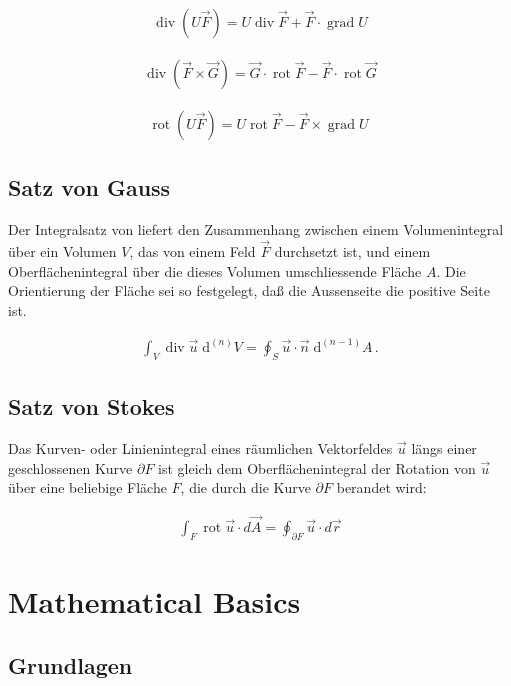 \documentclass[a4paper]{scrartcl}
\begin{document}
\begin{align}
\operatorname{div}(U\vec{F})=U\operatorname{div}\vec{F}+
\vec{F}\cdot\operatorname{grad}U
\end{align}

\begin{align}
\operatorname{div}(\vec{F}\times \vec{G})= \vec{G} \cdot
\operatorname{rot}\vec{F} -\vec{F}\cdot\operatorname{rot}\vec{G}
\end{align}

\begin{align}
\operatorname{rot}(U\vec{F})= U\operatorname{rot}\vec{F}
-\vec{F}\times\operatorname{grad}U\
\end{align}
\subsection{Satz von Gauss}
Der Integralsatz von  liefert den Zusammenhang zwischen einem Volumenintegral
über ein Volumen $V$, das von einem Feld $\vec F$ durchsetzt ist, und einem
Oberflächenintegral über die dieses Volumen umschliessende Fläche $A$. Die
Orientierung der Fläche sei so festgelegt, daß die Aussenseite die positive
Seite ist.

\begin{align}
\int_V \operatorname{div} \vec u \; \mathrm d^{(n)}V = \oint_{S} \vec u \cdot
\vec n\; \mathrm d^{(n-1)}A\,.
\end{align}
\subsection{Satz von Stokes}
Das Kurven- oder Linienintegral eines räumlichen Vektorfeldes $\vec u$ längs
einer geschlossenen Kurve $\partial F$ ist gleich dem Oberflächenintegral der
Rotation von $\vec u$ über eine beliebige Fläche $F$, die durch die Kurve
$\partial F$ berandet wird:

\begin{align}
 \int_{F} \operatorname{rot} \vec u \cdot d \vec A =
\oint_{\partial F} \vec u \cdot d \vec r
\end{align}


\section{Mathematical Basics}
\subsection{Grundlagen}
\end{document}

